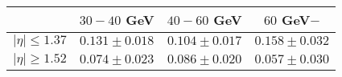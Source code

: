 \centering
\begin{tabular}{|c|c|c|c|} \hline
& $30-40$ GeV & $40-60$ GeV & $60$ GeV$-$\\\hline
$\lvert \eta \rvert \leq 1.37$ & $0.131\pm0.018$ & $0.104\pm0.017$ & $0.158\pm0.032$\\\hline
$\lvert \eta \rvert \geq 1.52$ & $0.074\pm0.023$ & $0.086\pm0.020$ & $0.057\pm0.030$\\\hline
\end{tabular}

